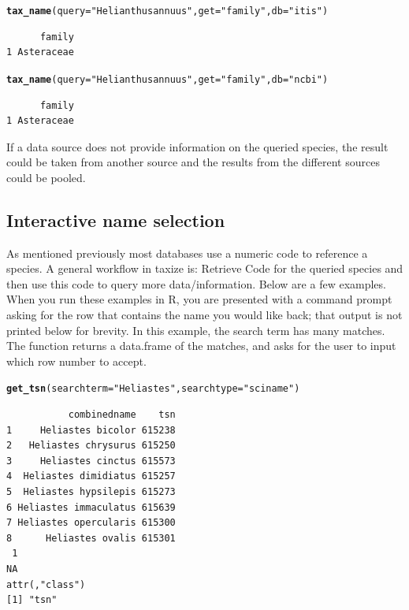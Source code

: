 \documentclass[10pt,a4paper,twocolumn]{article}
\makeatletter
\newcommand{\hlfunctioncall}[1]{\textcolor[rgb]{0.501960784313725,0,0.329411764705882}{\textbf{#1}}}%
\newcommand{\hlstring}[1]{\textcolor[rgb]{0.6,0.6,1}{#1}}%
\newenvironment{kframe}{%
 \def\at@end@of@kframe{}%
 \ifinner\ifhmode%
  \def\at@end@of@kframe{\end{minipage}}%
  \begin{minipage}{\columnwidth}%
 \fi\fi%
 \def\FrameCommand##1{\hskip\@totalleftmargin \hskip-\fboxsep
 \colorbox{shadecolor}{##1}\hskip-\fboxsep
     \hskip-\linewidth \hskip-\@totalleftmargin \hskip\columnwidth}%
 \MakeFramed {\advance\hsize-\width
   \@totalleftmargin\z@ \linewidth\hsize
   \@setminipage}}%
 {\par\unskip\endMakeFramed%
 \at@end@of@kframe}
\newenvironment{knitrout}{}{} %
\makeatother
\begin{document}
\begin{knitrout}
\begin{scriptsize}
\color{fgcolor}\begin{kframe}
\begin{alltt}
\hlfunctioncall{tax_name}(query = \hlstring{"Helianthus annuus"}, get = \hlstring{"family"}, \newline db = \hlstring{"itis"})
\end{alltt}
\begin{verbatim}
      family
1 Asteraceae
\end{verbatim}
\begin{alltt}
\hlfunctioncall{tax_name}(query = \hlstring{"Helianthus annuus"}, get = \hlstring{"family"}, \newline db = \hlstring{"ncbi"})
\end{alltt}
\begin{verbatim}
      family
1 Asteraceae
\end{verbatim}
\end{kframe}
\end{scriptsize}
\end{knitrout}

If a data source does not provide information on the queried species, the result could be taken from another source and the results from the different sources could be pooled.

\subsection*{Interactive name selection}
As mentioned previously most databases use a numeric code to reference a species. A general workflow in taxize is: Retrieve Code for the queried species and then use this code to query more data/information. Below are a few examples. When you run these examples in R, you are presented with a command prompt asking for the row that contains the name you would like back; that output is not printed below for brevity. In this example, the search term has many matches. The function returns a data.frame of the matches, and asks for the user to input which row number to accept. 

\begin{knitrout}
\begin{scriptsize}
\color{fgcolor}\begin{kframe}
\begin{alltt}
\hlfunctioncall{get_tsn}(searchterm = \hlstring{"Heliastes"}, searchtype = \hlstring{"sciname"})
\end{alltt}
\begin{verbatim}
           combinedname    tsn
1     Heliastes bicolor 615238
2   Heliastes chrysurus 615250
3     Heliastes cinctus 615573
4  Heliastes dimidiatus 615257
5  Heliastes hypsilepis 615273
6 Heliastes immaculatus 615639
7 Heliastes opercularis 615300
8      Heliastes ovalis 615301
 1 
NA 
attr(,"class")
[1] "tsn"
\end{verbatim}
\end{kframe}
\end{scriptsize}
\end{knitrout}
\end{document}
